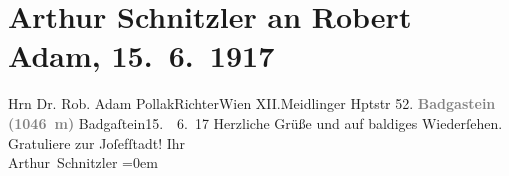 

         
         \renewcommand{\erwaehntePersonen}{Personen: Robert Adam}
         \renewcommand{\erwaehnteInstitutionen}{Institutionen: Bezirksgericht Wien Josefstadt}
         \renewcommand{\erwaehnteOrte}{Orte: Bad Gastein, Meidlinger Hauptstraße, Wien, XII., Meidling}
         \renewcommand{\erwaehnteWerke}{}
               \section[Arthur Schnitzler an Robert Adam, 15. 6. 1917]{ Arthur Schnitzler an Robert Adam, 15. 6. 1917}\nopagebreak{}\rehead{ }\begin{ledgroupsized}[t]{13cm}\normalsize\beginnumbering{} \toendnotes[C]{\smallbreak\pagebreak[2]} 
\toendnotes[C]{\smallbreak}\pstart{}{\pb}Hrn Dr. Rob. Adam Pollak\pend{}\pstart{}Richter\pend{}\pstart{}Wien XII.\pend{}\pstart{}Meidlinger Hptstr 52. \pend{}{\bigskip}\pstart
           \noindent{}\centering{}{\pb}\textcolor{gray}{\textbf{Badgastein (1046 m)}}\pend
           \pstart
           \raggedleft{}{\pb}Badgaſtein15.  6. 17\pend
           \pstart
           Herzliche Grüße und auf baldiges Wiederſehen. Gratuliere zur Joſefſtadt!\pend
           \pstart
           Ihr{\\[\baselineskip]}\spacefill\mbox{Arthur Schnitzler}\pend
           \leftskip=0em{}
         
         \endnumbering{}\end{ledgroupsized}  \newcommand{\dateiname}{L02263}\newcommand{\titel}{Arthur Schnitzler an Robert Adam, 15. 6. 1917}\newcommand{\editorInnen}{Martin Anton Müller und Gerd-Hermann Susen}
      